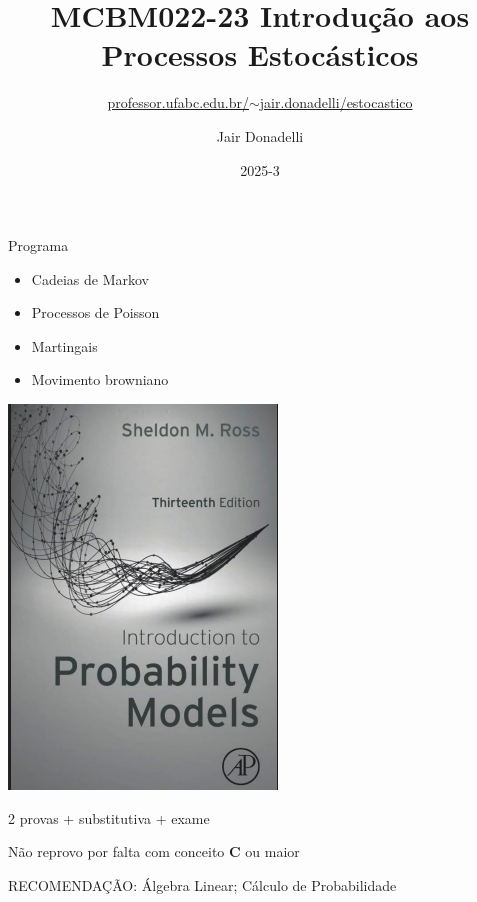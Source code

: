 \documentclass{beamer}
\title{MCBM022-23 Introdução aos Processos Estocásticos}
\subtitle{\href{http://professor.ufabc.edu.br/~jair.donadelli/estocastico/}%
  {professor.ufabc.edu.br/$\sim${}jair.donadelli/estocastico}}
\author{Jair Donadelli}
\date{2025-3}
\begin{document}
\frame{\titlepage}

\begin{frame}{Programa}

  \begin{minipage}[h]{.45\linewidth}
    
    \begin{itemize}
    \item Cadeias de Markov 
    \item Processos de Poisson
    \item Martingais
    \item Movimento browniano
    \end{itemize}
    
  \end{minipage}
  \begin{minipage}[h]{.45\linewidth}

    \includegraphics[scale=.3]{livro.png}
    
  \end{minipage}

  
  \vfill

  2 provas + substitutiva + exame 
  
  \vfill

  Não reprovo por falta com conceito \textbf{C} ou maior
  
  \vfill

 
  RECOMENDAÇÃO: Álgebra Linear; Cálculo de Probabilidade 
  
\end{frame}
\end{document}
